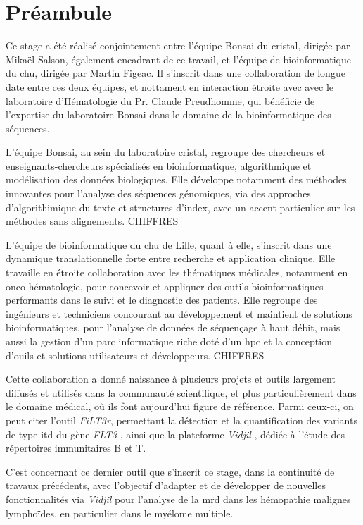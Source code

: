 \chapter{Préambule}

Ce stage a été réalisé conjointement entre l'équipe Bonsai du \gls{cristal}, 
dirigée par Mikaël Salson, également encadrant de ce travail, 
et l'équipe de bioinformatique du \gls{chu}, dirigée par Martin Figeac. 
Il s'inscrit dans une collaboration de longue date entre ces deux équipes, 
et nottament en interaction étroite avec avec le laboratoire d'Hématologie du Pr. Claude Preudhomme, 
qui bénéficie de l'expertise du laboratoire Bonsai dans le domaine de la bioinformatique 
des séquences.

\vspace{1em}

L'équipe Bonsai, au sein du laboratoire \gls{cristal}, regroupe des chercheurs et enseignants-chercheurs
spécialisés en bioinformatique, algorithmique et modélisation des données biologiques. 
Elle développe notamment des méthodes innovantes pour l'analyse des séquences génomiques, 
via des approches d'algorithimique du texte et structures d'index, avec un accent particulier 
sur les méthodes sans alignements. CHIFFRES

\vspace{1em}

L'équipe de bioinformatique du \gls{chu} de Lille, quant à elle, 
s'inscrit dans une dynamique translationnelle forte entre recherche et application clinique. 
Elle travaille en étroite collaboration avec les thématiques médicales, notamment en onco-hématologie, 
pour concevoir et appliquer des outils bioinformatiques performants dans le suivi et le diagnostic des patients.
Elle regroupe des ingénieurs et techniciens concourant au développement et maintient de solutions bioinformatiques,
pour l'analyse de données de séquençage à haut débit, mais aussi la gestion d'un parc informatique riche doté 
d'un \gls{hpc} et la conception d'ouils et solutions utilisateurs et développeurs. CHIFFRES

\vspace{1em}

Cette collaboration a donné naissance à plusieurs projets et outils 
largement diffusés et utilisés dans la communauté scientifique, 
et plus particulièrement dans le domaine médical, où ils font aujourd'hui figure de référence. 
Parmi ceux-ci, on peut citer l'outil \textit{FiLT3r}, permettant la détection 
et la quantification des variants de type \gls{itd} du gène \textit{FLT3} \cite{boudryFrugalAlignmentfreeIdentification2022}, 
ainsi que la plateforme \textit{Vidjil} \cite{duezVidjilWebPlatform2016}, dédiée à l'étude des répertoires immunitaires B et T.

\vspace{1em}

C'est concernant ce dernier outil que s'inscrit ce stage, dans la continuité de travaux précédents,
avec l'objectif d'adapter et de développer de nouvelles fonctionnalités via \textit{Vidjil} 
pour l'analyse de la \gls{mrd} dans les hémopathie malignes lymphoïdes, en particulier dans le myélome multiple.